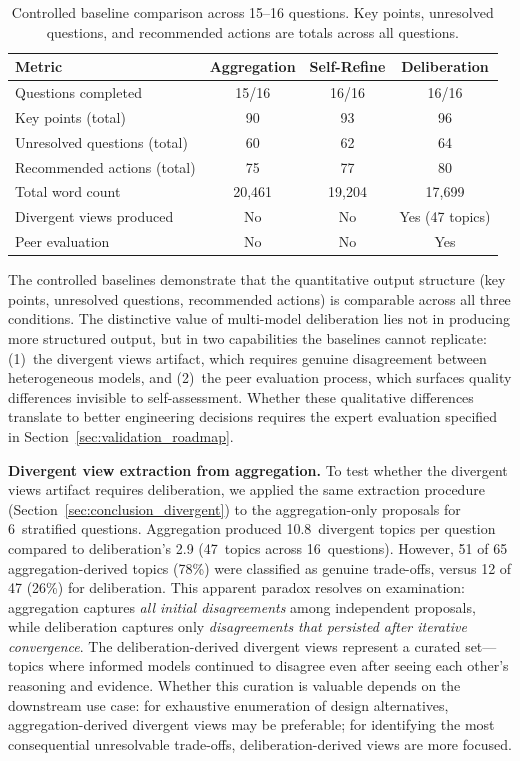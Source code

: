 \documentclass[11pt,a4paper]{article}
\begin{document}
\begin{table}[ht]
\centering
\caption{Controlled baseline comparison across 15--16 questions. Key points, unresolved questions, and recommended actions are totals across all questions.}
\label{tab:baselines}
\begin{tabular}{@{}lccc@{}}
\toprule
\textbf{Metric} & \textbf{Aggregation} & \textbf{Self-Refine} & \textbf{Deliberation} \\
\midrule
Questions completed & 15/16 & 16/16 & 16/16 \\
Key points (total) & 90 & 93 & 96 \\
Unresolved questions (total) & 60 & 62 & 64 \\
Recommended actions (total) & 75 & 77 & 80 \\
Total word count & 20{,}461 & 19{,}204 & 17{,}699 \\
Divergent views produced & No & No & Yes (47 topics) \\
Peer evaluation & No & No & Yes \\
\bottomrule
\end{tabular}
\end{table}

The controlled baselines demonstrate that the quantitative output structure (key points, unresolved questions, recommended actions) is comparable across all three conditions. The distinctive value of multi-model deliberation lies not in producing more structured output, but in two capabilities the baselines cannot replicate: (1)~the divergent views artifact, which requires genuine disagreement between heterogeneous models, and (2)~the peer evaluation process, which surfaces quality differences invisible to self-assessment. Whether these qualitative differences translate to better engineering decisions requires the expert evaluation specified in Section~\ref{sec:validation_roadmap}.

\textbf{Divergent view extraction from aggregation.} To test whether the divergent views artifact requires deliberation, we applied the same extraction procedure (Section~\ref{sec:conclusion_divergent}) to the aggregation-only proposals for 6~stratified questions. Aggregation produced 10.8~divergent topics per question compared to deliberation's 2.9 (47~topics across 16~questions). However, 51 of 65 aggregation-derived topics (78\%) were classified as genuine trade-offs, versus 12 of 47 (26\%) for deliberation. This apparent paradox resolves on examination: aggregation captures \textit{all initial disagreements} among independent proposals, while deliberation captures only \textit{disagreements that persisted after iterative convergence}. The deliberation-derived divergent views represent a curated set---topics where informed models continued to disagree even after seeing each other's reasoning and evidence. Whether this curation is valuable depends on the downstream use case: for exhaustive enumeration of design alternatives, aggregation-derived divergent views may be preferable; for identifying the most consequential unresolvable trade-offs, deliberation-derived views are more focused.
\end{document}
